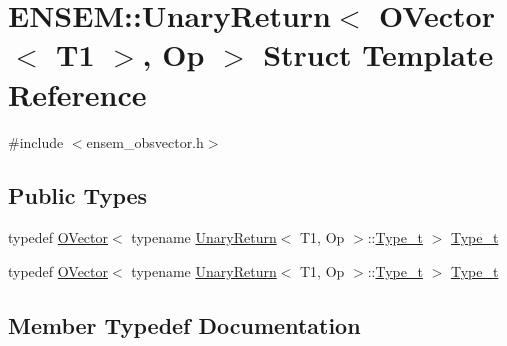 \hypertarget{structENSEM_1_1UnaryReturn_3_01OVector_3_01T1_01_4_00_01Op_01_4}{}\section{E\+N\+S\+EM\+:\+:Unary\+Return$<$ O\+Vector$<$ T1 $>$, Op $>$ Struct Template Reference}
\label{structENSEM_1_1UnaryReturn_3_01OVector_3_01T1_01_4_00_01Op_01_4}


{\ttfamily \#include $<$ensem\+\_\+obsvector.\+h$>$}

\subsection*{Public Types}
\begin{DoxyCompactItemize}
\item 
typedef \mbox{\hyperlink{classENSEM_1_1OVector}{O\+Vector}}$<$ typename \mbox{\hyperlink{structENSEM_1_1UnaryReturn}{Unary\+Return}}$<$ T1, Op $>$\+::\mbox{\hyperlink{structENSEM_1_1UnaryReturn_3_01OVector_3_01T1_01_4_00_01Op_01_4_a271ecea83fd5cd6b106bd500ff150660}{Type\+\_\+t}} $>$ \mbox{\hyperlink{structENSEM_1_1UnaryReturn_3_01OVector_3_01T1_01_4_00_01Op_01_4_a271ecea83fd5cd6b106bd500ff150660}{Type\+\_\+t}}
\item 
typedef \mbox{\hyperlink{classENSEM_1_1OVector}{O\+Vector}}$<$ typename \mbox{\hyperlink{structENSEM_1_1UnaryReturn}{Unary\+Return}}$<$ T1, Op $>$\+::\mbox{\hyperlink{structENSEM_1_1UnaryReturn_3_01OVector_3_01T1_01_4_00_01Op_01_4_a271ecea83fd5cd6b106bd500ff150660}{Type\+\_\+t}} $>$ \mbox{\hyperlink{structENSEM_1_1UnaryReturn_3_01OVector_3_01T1_01_4_00_01Op_01_4_a271ecea83fd5cd6b106bd500ff150660}{Type\+\_\+t}}
\end{DoxyCompactItemize}


\subsection{Member Typedef Documentation}
\mbox{\label{structENSEM_1_1UnaryReturn_3_01OVector_3_01T1_01_4_00_01Op_01_4_a271ecea83fd5cd6b106bd500ff150660}} 
